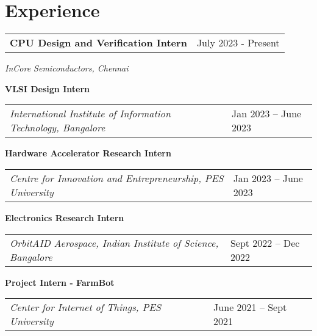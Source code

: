 \section{\sc Experience}

\begin{tabular}{@{}p{4in}p{2in}}
{\bf{CPU Design and Verification Intern}}  & July 2023 - Present \\
\end{tabular}  
    \textit{InCore Semiconductors, Chennai} 

   {\bf{VLSI Design Intern}} \\
   \begin{tabular}{@{}p{4in}p{2in}}
    \textit{International Institute of Information Technology, Bangalore}  & Jan 2023 – June 2023 \\
   \end{tabular}

   {\bf{Hardware Accelerator Research Intern}} \\
   \begin{tabular}{@{}p{4in}p{2in}}
    \textit{Centre for Innovation and Entrepreneurship, PES University}  & Jan 2023 – June 2023 \\
   \end{tabular}

   {\bf{Electronics Research Intern}} \\
   \begin{tabular}{@{}p{4in}p{2in}}
    \textit{OrbitAID Aerospace, Indian Institute of Science, Bangalore}  & Sept 2022 – Dec 2022 \\
   \end{tabular}

   {\bf{Project Intern - FarmBot}} \\
   \begin{tabular}{@{}p{4in}p{2in}}
    \textit{Center for Internet of Things, PES University}  & June 2021 – Sept 2021 \\
   \end{tabular}

   \endinput